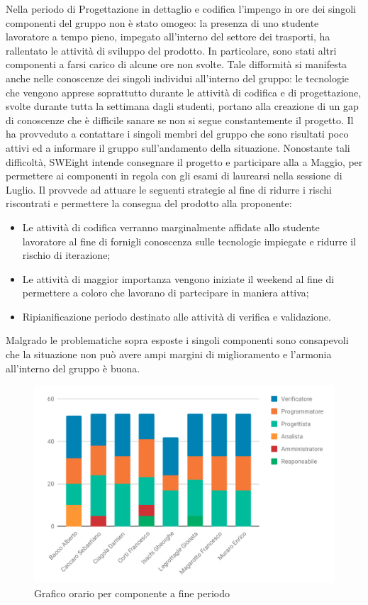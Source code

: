 Nella periodo di Progettazione in dettaglio e codifica l'impengo in ore dei singoli componenti del gruppo non è stato omogeo: la presenza di uno studente lavoratore a tempo pieno, impegato all'interno del settore dei trasporti, ha rallentato le attività di sviluppo del prodotto. In particolare, sono stati altri componenti a farsi carico di alcune ore non svolte. Tale difformità si manifesta anche nelle conoscenze dei singoli individui all'interno del gruppo: le tecnologie che vengono apprese soprattutto durante le attività di codifica e di progettazione, svolte durante tutta la settimana dagli studenti, portano alla creazione di un gap di conoscenze che è difficile sanare se non si segue constantemente il progetto. Il \RdP{} ha provveduto a contattare i singoli membri del gruppo che sono risultati poco attivi ed a informare il gruppo sull'andamento della situazione. Nonostante tali difficoltà, SWEight intende consegnare il progetto e participare alla \RA{} a Maggio, per permettere ai componenti in regola con gli esami di laurearsi nella sessione di Luglio. Il \RdP{} provvede ad attuare le seguenti strategie al fine di ridurre i rischi riscontrati e permettere la consegna del prodotto alla proponente:
\begin{itemize}
	\item Le attività di codifica verranno marginalmente affidate allo studente lavoratore al fine di fornigli conoscenza sulle tecnologie impiegate e ridurre il rischio di iterazione;
	\item Le attività di maggior importanza vengono iniziate il weekend al fine di permettere a coloro che lavorano di partecipare in maniera attiva;
	\item Ripianificazione periodo destinato alle attività di verifica e validazione.
\end{itemize}
Malgrado le problematiche sopra esposte i singoli componenti sono consapevoli che la situazione non può avere ampi margini di miglioramento e l'armonia all'interno del gruppo è buona.\\
\begin{figure}[H]
\centering
\includegraphics[scale=.8]{Consuntivo/grafici/ConsCod.pdf} 
\caption{Grafico orario per componente a fine periodo}
\end{figure}
